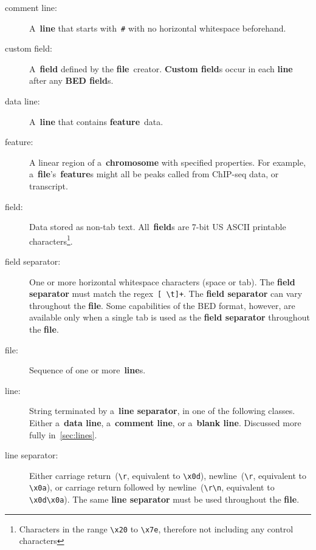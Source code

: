 \documentclass[11pt]{article}
\begin{document}
\begin{description}
\item[comment line:]
  A~\textbf{line} that starts with~\texttt{\#} with no horizontal whitespace beforehand.

\item[custom field:]
  A~\textbf{field} defined by the \textbf{file}~creator.
  \textbf{Custom field}s occur in each \textbf{line} after any \textbf{\acs{BED} field}s.

\item[data line:]
  A~\textbf{line} that contains \textbf{feature}~data.

\item[feature:]
  A linear region of a~\textbf{chromosome} with specified properties.
  For example, a~\textbf{file}'s~\textbf{feature}s might all be peaks called from ChIP-seq data, or transcript.

\item[field:]
  Data stored as non-tab text.
  All~\textbf{field}s are 7-bit US \ac{ASCII} printable characters\footnote{Characters in the range \texttt{{\textbackslash}x20} to \texttt{{\textbackslash}x7e}, therefore not including any control characters}.

\item[field separator:]
  One or more horizontal whitespace characters (space or tab).
  The \textbf{field separator} must match the \ac{regex}~\texttt{[ {\textbackslash}t]+}.
  The \textbf{field separator} can vary throughout the \textbf{file}.
  Some capabilities of the \ac{BED} format, however, are available only when a single tab is used as the \textbf{field separator} throughout the \textbf{file}.

\item[file:]
  Sequence of one or more~\textbf{line}s.

\item[line:]
  String terminated by a~\textbf{line separator}, in one of the following classes.
  Either a~\textbf{data line}, a~\textbf{comment line}, or a~\textbf{blank line}.
  Discussed more fully in~\autoref{sec:lines}.

\item[line separator:]
  Either carriage return~(\texttt{{\textbackslash}r}, equivalent to \texttt{{\textbackslash}x0d}), newline~(\texttt{{\textbackslash}r}, equivalent to \texttt{{\textbackslash}x0a}), or carriage return followed by newline~(\texttt{{\textbackslash}r{\textbackslash}n}, equivalent to \texttt{{\textbackslash}x0d{\textbackslash}x0a}).
  The same \textbf{line separator} must be used throughout the \textbf{file}.
\end{description}
\end{document}
